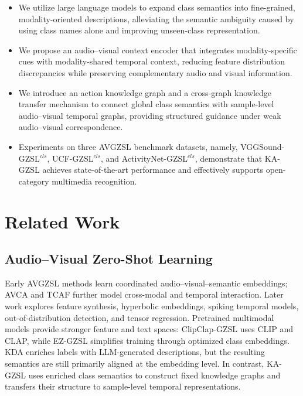 \documentclass[10pt,journal,twoside]{IEEEtran}
\begin{document}
\begin{itemize}
\item We utilize large language models to expand class semantics into
fine-grained, modality-oriented descriptions, alleviating the semantic
ambiguity caused by using class names alone and improving unseen-class
representation.

\item We propose an audio--visual context encoder that integrates
modality-specific cues with modality-shared temporal context, reducing
feature distribution discrepancies while preserving complementary
audio and visual information.

\item We introduce an action knowledge graph and a cross-graph
knowledge transfer mechanism to connect global class semantics with
sample-level audio--visual temporal graphs, providing structured
guidance under weak audio--visual correspondence.

\item Experiments on three AVGZSL benchmark datasets, namely,
VGGSound-GZSL$^{\textit{cls}}$, UCF-GZSL$^{\textit{cls}}$, and
ActivityNet-GZSL$^{\textit{cls}}$, demonstrate that KA-GZSL achieves
state-of-the-art performance and effectively supports open-category
multimedia recognition.
\end{itemize}


\section{Related Work}
\subsection{Audio–Visual Zero-Shot Learning}
Early AVGZSL methods learn coordinated audio--visual--semantic embeddings\cite{3,4}; AVCA\cite{1} and TCAF\cite{5} further model cross-modal and temporal interaction. Later work explores feature synthesis\cite{6}, hyperbolic embeddings\cite{7}, spiking temporal models\cite{8,43,44}, out-of-distribution detection\cite{13}, and tensor regression\cite{14}. Pretrained multimodal models provide stronger feature and text spaces: ClipClap-GZSL\cite{2} uses CLIP\cite{10} and CLAP\cite{11}, while EZ-GZSL\cite{12} simplifies training through optimized class embeddings. KDA\cite{9} enriches labels with LLM-generated descriptions, but the resulting semantics are still primarily aligned at the embedding level. In contrast, KA-GZSL uses enriched class semantics to construct fixed knowledge graphs and transfers their structure to sample-level temporal representations.
\end{document}
